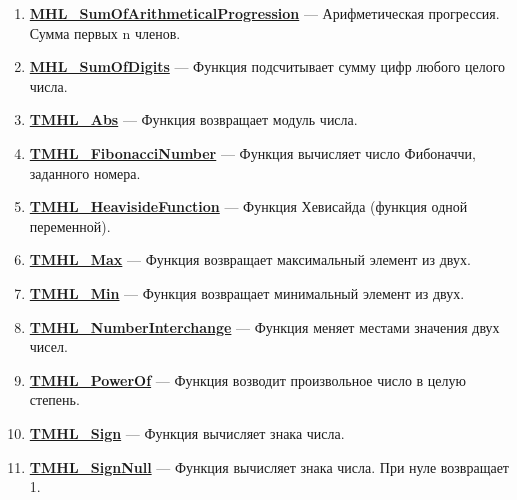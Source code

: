 \documentclass[a4paper,12pt]{article}
\begin{document}
\begin{enumerate}
\item \textbf{\hyperref[MHL_SumOfArithmeticalProgression]{MHL\_SumOfArithmeticalProgression}} --- Арифметическая прогрессия. Сумма первых n членов.

\item \textbf{\hyperref[MHL_SumOfDigits]{MHL\_SumOfDigits}} --- Функция подсчитывает сумму цифр любого целого числа.

\item \textbf{\hyperref[TMHL_Abs]{TMHL\_Abs}} --- Функция возвращает модуль числа.

\item \textbf{\hyperref[TMHL_FibonacciNumber]{TMHL\_FibonacciNumber}} --- Функция вычисляет число Фибоначчи, заданного номера.

\item \textbf{\hyperref[TMHL_HeavisideFunction]{TMHL\_HeavisideFunction}} --- Функция Хевисайда (функция одной переменной).

\item \textbf{\hyperref[TMHL_Max]{TMHL\_Max}} --- Функция возвращает максимальный элемент из двух.

\item \textbf{\hyperref[TMHL_Min]{TMHL\_Min}} --- Функция возвращает минимальный элемент из двух.

\item \textbf{\hyperref[TMHL_NumberInterchange]{TMHL\_NumberInterchange}} --- Функция меняет местами значения двух чисел.

\item \textbf{\hyperref[TMHL_PowerOf]{TMHL\_PowerOf}} --- Функция возводит произвольное число в целую степень.

\item \textbf{\hyperref[TMHL_Sign]{TMHL\_Sign}} --- Функция вычисляет знака числа.

\item \textbf{\hyperref[TMHL_SignNull]{TMHL\_SignNull}} --- Функция вычисляет знака числа. При нуле возвращает 1.

\end{enumerate}
\end{document}
